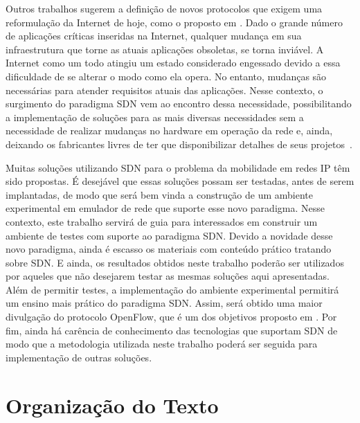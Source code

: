 \documentclass[	12pt, Times, openright, twoside, a4paper, english, brazil]{abntex2}
\begin{document}
Outros trabalhos sugerem a definição de novos protocolos que exigem uma reformulação da Internet de hoje, como o proposto em \cite{Shalimov2013}. Dado o grande número de aplicações críticas inseridas na Internet, qualquer mudança em sua infraestrutura que torne as atuais aplicações obsoletas, se torna inviável. A Internet como um todo atingiu um estado considerado engessado devido a essa dificuldade de se alterar o modo como ela opera. No entanto, mudanças são necessárias para atender requisitos atuais das aplicações. Nesse contexto, o surgimento do paradigma SDN vem ao encontro dessa necessidade, possibilitando a implementação de soluções para as mais diversas necessidades sem a necessidade de realizar mudanças no hardware em operação da rede e, ainda, deixando os fabricantes livres de ter que disponibilizar detalhes de seus projetos~\cite{McKeown}.

Muitas soluções utilizando SDN para o problema da mobilidade em redes IP têm sido propostas. É desejável que essas soluções possam ser testadas, antes de serem implantadas, de modo que será bem vinda a construção de um ambiente experimental em emulador de rede que suporte esse novo paradigma. Nesse contexto, este trabalho servirá de guia para interessados em  construir um ambiente de testes com suporte ao paradigma SDN. Devido a novidade desse novo paradigma, ainda é escasso os materiais com conteúdo prático tratando sobre SDN. E ainda, os resultados obtidos neste trabalho poderão ser utilizados por aqueles que não desejarem testar as mesmas soluções aqui apresentadas. Além de permitir testes, a implementação do ambiente experimental permitirá um ensino mais prático do paradigma SDN. Assim, será obtido uma maior divulgação do protocolo OpenFlow, que é um dos objetivos proposto em \cite{McKeown}. Por fim, ainda há carência de conhecimento das tecnologias que suportam SDN de modo que a metodologia utilizada neste trabalho poderá ser seguida para implementação de outras soluções.


\section{Organização do Texto}

\end{document}

